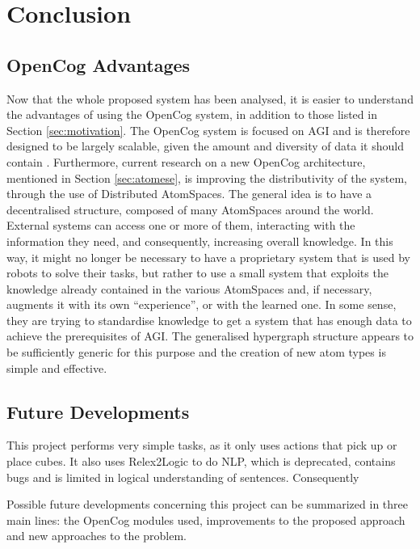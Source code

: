 \chapter{Conclusion} \label{cha:conclusion}

\section{OpenCog Advantages}\label{sec:opencog_advantages}

Now that the whole proposed system has been analysed, it is easier to understand the advantages of using the OpenCog system, in addition to those listed in Section \ref{sec:motivation}.
The OpenCog system is focused on AGI and is therefore designed to be largely scalable, given the amount and diversity of data it should contain \cite{net_scalab_2021}.
Furthermore, current research on a new OpenCog architecture, mentioned in Section \ref{sec:atomese}, is improving the distributivity of the system, through the use of Distributed AtomSpaces. The general idea is to have a decentralised structure, composed of many AtomSpaces around the world. External systems can access one or more of them, interacting with the information they need, and consequently, increasing overall knowledge. In this way, it might no longer be necessary to have a proprietary system that is used by robots to solve their tasks, but rather to use a small system that exploits the knowledge already contained in the various AtomSpaces and, if necessary, augments it with its own \enquote{experience}, or with the learned one. In some sense, they are trying to standardise knowledge to get a system that has enough data to achieve the prerequisites of AGI.
The generalised hypergraph structure appears to be sufficiently generic for this purpose and the creation of new atom types is simple and effective. 



\section{Future Developments}\label{sec:future_devel}


This project performs very simple tasks, as it only uses actions that pick up or place cubes. 
It also uses Relex2Logic to do NLP, which is deprecated, contains bugs and is limited in logical understanding of sentences.
Consequently 

Possible future developments concerning this project can be summarized in three main lines: the OpenCog modules used, improvements to the proposed approach and new approaches to the problem.

